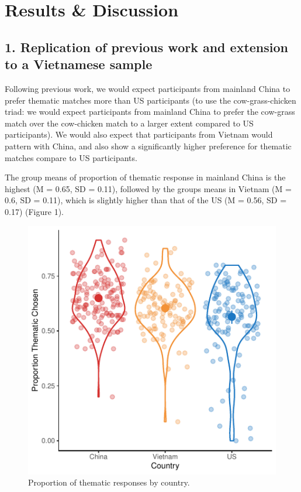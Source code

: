 \documentclass[10pt, letterpaper]{article}
\newenvironment{CodeChunk}{}{}
\begin{document}
\hypertarget{results-discussion}{%
\section{Results \& Discussion}\label{results-discussion}}

\hypertarget{replication-of-previous-work-and-extension-to-a-vietnamese-sample}{%
\subsection{1. Replication of previous work and extension to a
Vietnamese
sample}\label{replication-of-previous-work-and-extension-to-a-vietnamese-sample}}

Following previous work, we would expect participants from mainland
China to prefer thematic matches more than US participants (to use the
cow-grass-chicken triad: we would expect participants from mainland
China to prefer the cow-grass match over the cow-chicken match to a
larger extent compared to US participants). We would also expect that
participants from Vietnam would pattern with China, and also show a
significantly higher preference for thematic matches compare to US
participants.

The group means of proportion of thematic response in mainland China is
the highest (M = 0.65, SD = 0.11), followed by the groups means in
Vietnam (M = 0.6, SD = 0.11), which is slightly higher than that of the
US (M = 0.56, SD = 0.17) (Figure 1).

\begin{CodeChunk}
\begin{figure}[tb]

{\centering \includegraphics{figs/unnamed-chunk-1-1} 

}

\caption[Proportion of thematic responses by country]{Proportion of thematic responses by country.}\label{fig:unnamed-chunk-1}
\end{figure}
\end{CodeChunk}
\end{document}
